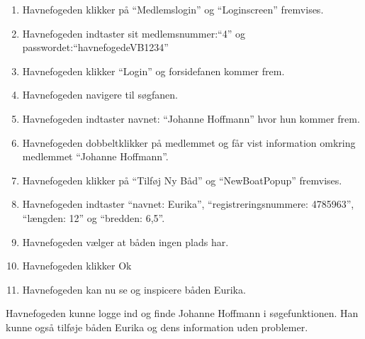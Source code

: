 \begin{enumerate}
	\item Havnefogeden klikker på \enquote{Medlemslogin} og \enquote{Loginscreen} fremvises.
	\item Havnefogeden indtaster sit medlemsnummer:\enquote{4} og passwordet:\enquote{havnefogedeVB1234}
	\item Havnefogeden klikker \enquote{Login} og forsidefanen kommer frem.
	\item Havnefogeden navigere til søgfanen.
	\item Havnefogeden indtaster navnet: \enquote{Johanne Hoffmann} hvor hun kommer frem.
	\item Havnefogeden dobbeltklikker på medlemmet og får vist information omkring medlemmet \enquote{Johanne Hoffmann}.
	\item Havnefogeden klikker på \enquote{Tilføj Ny Båd} og \enquote{NewBoatPopup} fremvises.
	\item Havnefogeden indtaster \enquote{navnet: Eurika}, \enquote{registreringsnummere: 4785963}, \enquote{længden: 12} og \enquote{bredden: 6,5}.
	\item Havnefogeden vælger at båden ingen plads har.
	\item Havnefogeden klikker Ok
	\item Havnefogeden kan nu se og inspicere båden Eurika.
\end{enumerate}

Havnefogeden kunne logge ind og finde Johanne Hoffmann i søgefunktionen. Han kunne også tilføje båden Eurika og dens information uden problemer.



			
